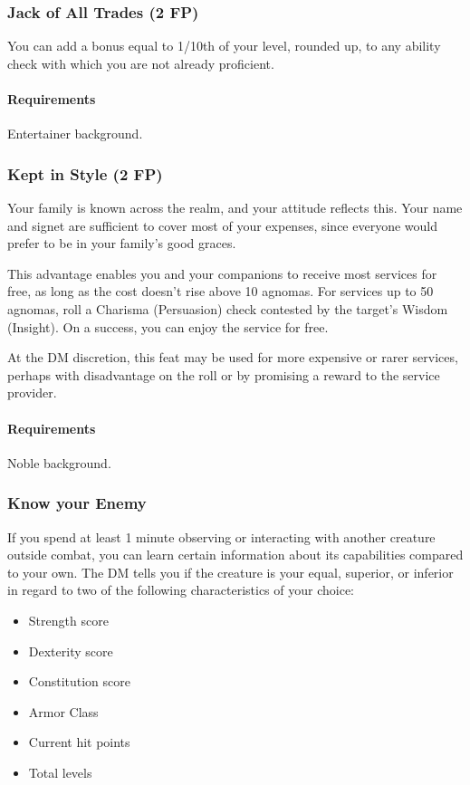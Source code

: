\subsubsection{Jack of All Trades (2 FP)} \label{feat::jackofalltrades}
    You can add a bonus equal to 1/10th of your level, rounded up, to any ability check with which you are not already proficient.
    \paragraph{Requirements} Entertainer background.
\subsubsection{Kept in Style (2 FP)} \label{feat::keptinstyle}
    Your family is known across the realm, and your attitude reflects this.
    Your name and signet are sufficient to cover most of your expenses, since everyone would prefer to be in your family's good graces.

    This advantage enables you and your companions to receive most services for free, as long as the cost doesn't rise above 10 agnomas.
    For services up to 50 agnomas, roll a Charisma (Persuasion) check contested by the target's Wisdom (Insight).
    On a success, you can enjoy the service for free.

    At the DM discretion, this feat may be used for more expensive or rarer services, perhaps with disadvantage on the roll or by promising a reward to the service provider.
    \paragraph{Requirements} Noble background.
\subsubsection{Know your Enemy} \label{feat::knowyourenemy}
    If you spend at least 1 minute observing or interacting with another creature outside combat, you can learn certain information about its capabilities compared to your own.
    The DM tells you if the creature is your equal, superior, or inferior in regard to two of the following characteristics of your choice:
    \begin{itemize}
        \item Strength score
        \item Dexterity score
        \item Constitution score
        \item Armor Class
        \item Current hit points
        \item Total levels
    \end{itemize}
